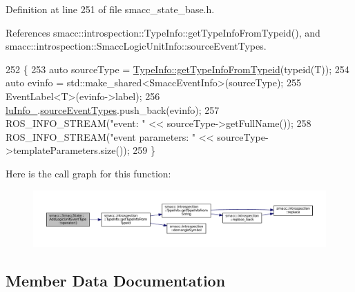 Definition at line 251 of file smacc\+\_\+state\+\_\+base.\+h.



References smacc\+::introspection\+::\+Type\+Info\+::get\+Type\+Info\+From\+Typeid(), and smacc\+::introspection\+::\+Smacc\+Logic\+Unit\+Info\+::source\+Event\+Types.


\begin{DoxyCode}
252     \{
253       \textcolor{keyword}{auto} sourceType = \hyperlink{classsmacc_1_1introspection_1_1TypeInfo_a09ec2f3f94a8f1fc82ae250216c38d47}{TypeInfo::getTypeInfoFromTypeid}(\textcolor{keyword}{typeid}(T));
254       \textcolor{keyword}{auto} evinfo = std::make\_shared<SmaccEventInfo>(sourceType);
255       EventLabel<T>(evinfo->label);
256       \hyperlink{structsmacc_1_1SmaccState_1_1AddLogicUnitEventType_a31c27ea945cd0127080c0bae872c028e}{luInfo\_}.\hyperlink{structsmacc_1_1introspection_1_1SmaccLogicUnitInfo_add386e83d888a7819c0132a75942fa5d}{sourceEventTypes}.push\_back(evinfo);
257       ROS\_INFO\_STREAM(\textcolor{stringliteral}{"event: "} << sourceType->getFullName());
258       ROS\_INFO\_STREAM(\textcolor{stringliteral}{"event parameters: "} << sourceType->templateParameters.size());
259     \}
\end{DoxyCode}


Here is the call graph for this function\+:
\nopagebreak
\begin{figure}[H]
\begin{center}
\leavevmode
\includegraphics[width=350pt]{structsmacc_1_1SmaccState_1_1AddLogicUnitEventType_a8ed7e96e4922fbc8097a6ff078d70150_cgraph}
\end{center}
\end{figure}




\subsection{Member Data Documentation}
